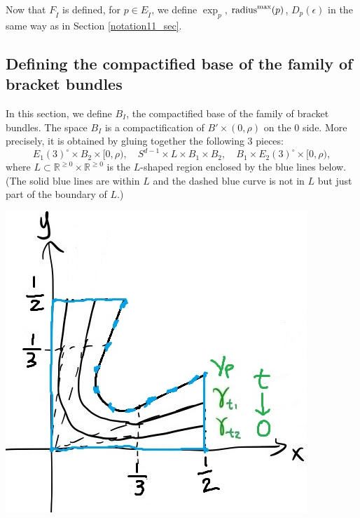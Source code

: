 \documentclass[11pt]{article}
\theoremstyle{definition}
\theoremstyle{remark}
\def\R{\mathbb{R}}
\def\rI{{\mathring{I}}}
\def\cmt#1{\textcolor{purple}{(#1)}}
\def\tn#1{\textnormal{#1}}
\begin{document}
Now that $F_\rI$ is defined, for $p\in E_\rI$, we define  $\exp_p$, $\tn{radius}^{\max}(p)$, $D_p(\epsilon)$ in the same way as in Section \ref{notation11_sec}. 

\subsection{Defining the compactified base of the family of bracket bundles}

In this section, we define $B_I$, the compactified base of the family of bracket bundles. 
The space $B_I$ is a compactification of 
$B'\times(0,\rho)$ on the 0 side. More precisely, it is obtained by gluing together the following 3 pieces: 
\begin{equation}\label{piecesBtl_eqn}
E_1(3)^\circ\times B_2\times[0,\rho),\quad S^{d-1}\times L\times B_1\times B_2,\quad B_1\times E_2(3)^\circ\times[0,\rho),
\end{equation}
where $L\subset \R^{\ge0}\times\R^{\ge0}$ is the $L$-shaped region enclosed by the blue lines below. (The solid blue lines are within $L$ and the dashed blue curve is not in $L$ but just part of the boundary of $L$.)

\includegraphics[scale=0.3]{gamma.jpg}
\end{document}
